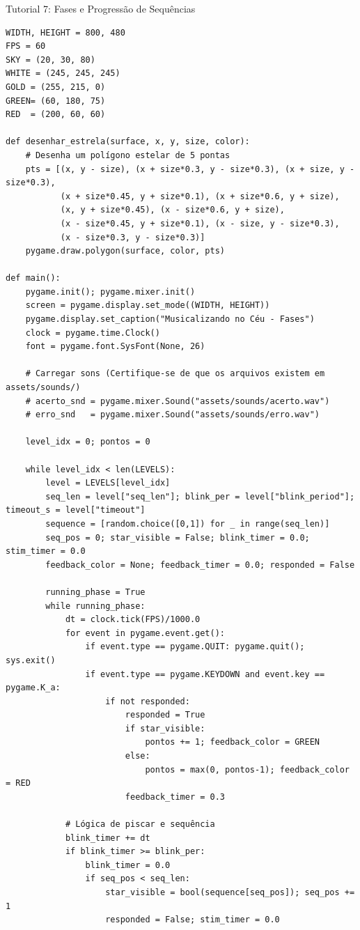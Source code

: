 \documentclass[11pt,a4paper]{article}
\begin{document}
\begin{boxTutorial}{Tutorial 7: Fases e Progressão de Sequências}
\begin{enumerate}
\begin{verbatim}
WIDTH, HEIGHT = 800, 480
FPS = 60
SKY = (20, 30, 80)
WHITE = (245, 245, 245)
GOLD = (255, 215, 0)
GREEN= (60, 180, 75)
RED  = (200, 60, 60)

def desenhar_estrela(surface, x, y, size, color):
    # Desenha um polígono estelar de 5 pontas
    pts = [(x, y - size), (x + size*0.3, y - size*0.3), (x + size, y - size*0.3),
           (x + size*0.45, y + size*0.1), (x + size*0.6, y + size),
           (x, y + size*0.45), (x - size*0.6, y + size),
           (x - size*0.45, y + size*0.1), (x - size, y - size*0.3),
           (x - size*0.3, y - size*0.3)]
    pygame.draw.polygon(surface, color, pts)

def main():
    pygame.init(); pygame.mixer.init()
    screen = pygame.display.set_mode((WIDTH, HEIGHT))
    pygame.display.set_caption("Musicalizando no Céu - Fases")
    clock = pygame.time.Clock()
    font = pygame.font.SysFont(None, 26)

    # Carregar sons (Certifique-se de que os arquivos existem em assets/sounds/)
    # acerto_snd = pygame.mixer.Sound("assets/sounds/acerto.wav")
    # erro_snd   = pygame.mixer.Sound("assets/sounds/erro.wav")

    level_idx = 0; pontos = 0

    while level_idx < len(LEVELS):
        level = LEVELS[level_idx]
        seq_len = level["seq_len"]; blink_per = level["blink_period"]; timeout_s = level["timeout"]
        sequence = [random.choice([0,1]) for _ in range(seq_len)]
        seq_pos = 0; star_visible = False; blink_timer = 0.0; stim_timer = 0.0
        feedback_color = None; feedback_timer = 0.0; responded = False

        running_phase = True
        while running_phase:
            dt = clock.tick(FPS)/1000.0
            for event in pygame.event.get():
                if event.type == pygame.QUIT: pygame.quit(); sys.exit()
                if event.type == pygame.KEYDOWN and event.key == pygame.K_a:
                    if not responded:
                        responded = True
                        if star_visible:
                            pontos += 1; feedback_color = GREEN
                        else:
                            pontos = max(0, pontos-1); feedback_color = RED
                        feedback_timer = 0.3

            # Lógica de piscar e sequência
            blink_timer += dt
            if blink_timer >= blink_per:
                blink_timer = 0.0
                if seq_pos < seq_len:
                    star_visible = bool(sequence[seq_pos]); seq_pos += 1
                    responded = False; stim_timer = 0.0
            

\end{verbatim}
\end{enumerate}
\end{boxTutorial}
\end{document}

